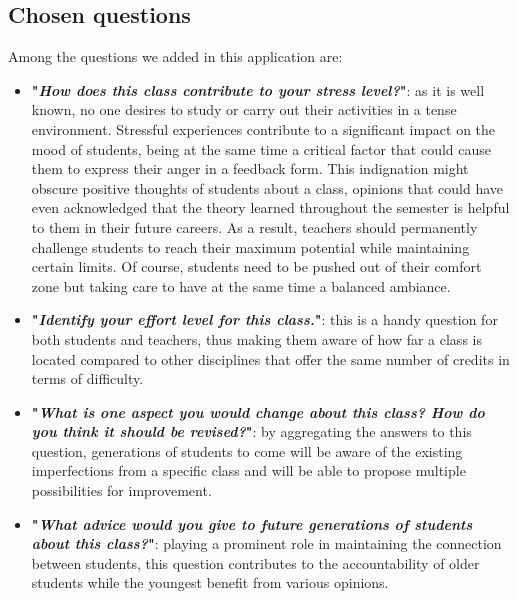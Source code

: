 	\subsection{Chosen questions} \label{4:chosen_questions}
	
    Among the questions \cite{questionestablishment} we added in this application are:
    
    \begin{itemize}
            \setlength{\topsep}{0.5pt}
            \setlength{\itemsep}{0.5pt}
            \setlength{\parsep}{0.5pt}
            \item \textbf{"\textit{How does this class contribute to your stress level?}"}: as it is well known, no one desires to study or carry out their activities in a tense environment. Stressful experiences contribute to a significant impact on the mood of students, being at the same time a critical factor that could cause them to express their anger in a feedback form. This indignation might obscure positive thoughts of students about a class, opinions that could have even acknowledged that the theory learned throughout the semester is helpful to them in their future careers. As a result, teachers should permanently challenge students to reach their maximum potential while maintaining certain limits. Of course, students need to be pushed out of their comfort zone but taking care to have at the same time a balanced ambiance.

            \item \textbf{"\textit{Identify your effort level for this class.}"}: this is a handy question for both students and teachers, thus making them aware of how far a class is located compared to other disciplines that offer the same number of credits in terms of difficulty.
            
            \item \textbf{"\textit{What is one aspect you would change about this class? How do you think it should be revised?}"}: by aggregating the answers to this question, generations of students to come will be aware of the existing imperfections from a specific class and will be able to propose multiple possibilities for improvement. 
            
            \item \textbf{"\textit{What advice would you give to future generations of students about this class?}"}: playing a prominent role in maintaining the connection between students, this question contributes to the accountability of older students while the youngest benefit from various opinions.
            

\end{itemize}
